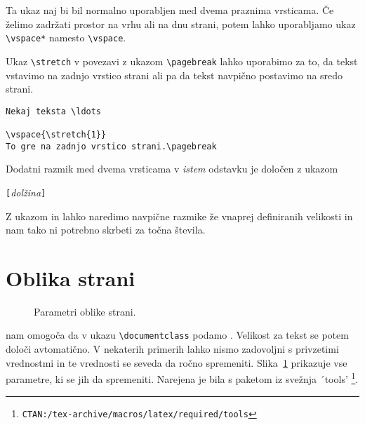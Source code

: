 Ta ukaz naj bi bil normalno uporabljen med dvema praznima vrsticama.
Če želimo zadržati prostor na vrhu ali na dnu strani, potem lahko uporabljamo
ukaz \verb|\vspace*| namesto \verb|\vspace|.

Ukaz \verb|\stretch| v povezavi z ukazom \verb|\pagebreak| lahko uporabimo za to, 
da tekst vstavimo na zadnjo vrstico strani ali pa da tekst navpično postavimo na 
sredo strani.
\begin{code}
\begin{verbatim}
Nekaj teksta \ldots

\vspace{\stretch{1}}
To gre na zadnjo vrstico strani.\pagebreak
\end{verbatim}
\end{code}

Dodatni razmik med dvema vrsticama v \emph{istem} odstavku je 
določen z ukazom
\begin{lscommand}
\ci{\bs}\verb|[|\emph{dolžina}\verb|]|
\end{lscommand}

Z ukazom  in  lahko naredimo navpične razmike že vnaprej definiranih velikosti in nam
tako ni potrebno skrbeti za točna števila.


\section{Oblika strani}

\begin{figure}[!hp]
\begin{center}
\makeatletter\@mylayout\makeatother
\end{center}
\vspace*{1.8cm}
\caption{Parametri oblike strani.}
\label{fig:layout}
\end{figure}
\LaTeXe{} nam omogoča da v ukazu \verb|\documentclass| podamo . 
Velikost  za tekst se potem določi avtomatično.
V nekaterih primerih lahko nismo zadovoljni s privzetimi vrednostmi in te vrednosti se 
seveda da ročno spremeniti.
\thispagestyle{fancyplain}
Slika~\ref{fig:layout} prikazuje vse parametre, ki se jih da spremeniti.
Narejena je bila s paketom  iz svežnja ´tools'%
\footnote{\texttt{CTAN:/tex-archive/macros/latex/required/tools}}.

